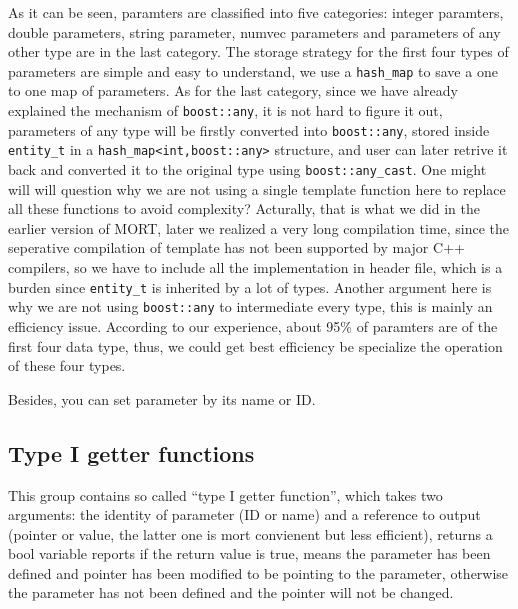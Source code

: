 \documentclass[letterpaper]{book}
\begin{document}
 As it can be seen, paramters are classified into five categories: integer paramters,
double parameters, string parameter, numvec parameters and parameters of any other type are
in the last category. The storage strategy for the first four types of parameters are simple
and easy to understand, we use a \lstinline$hash_map$ to save a one to one map of parameters. 
As for the last category, since we have already explained the mechanism of \lstinline$boost::any$, 
it is not hard to figure it out, parameters of any type will be firstly converted into 
\lstinline$boost::any$, stored inside \lstinline$entity_t$ in a \lstinline$hash_map<int,boost::any>$
structure, and user can later retrive it back and converted it to the original type using 
\lstinline$boost::any_cast$. One might will will question why we are not using a single template
function here to replace all these functions to avoid complexity? Acturally, that is what we did in the
earlier version of MORT, later we realized a very long compilation time, since the seperative compilation
of template has not been supported by major C++ compilers, so we have to include all the implementation
in header file, which is a burden since \lstinline$entity_t$ is inherited by a lot of types. 
Another argument here is why we are not using \lstinline$boost::any$ to intermediate every type, this is 
mainly an efficiency issue. According to our experience, about 95\% of paramters are of the first four data 
type, thus, we could get best efficiency be specialize the operation of these four types.
  
  Besides, you can set parameter by its name or ID.

\subsection{Type I getter functions}
  This group contains so called ``type I getter function'', which takes two arguments: the identity of 
parameter (ID or name) and a reference to output (pointer or value, the latter one is mort convienent
but less efficient), returns a bool variable reports if the 
return value is true, means the parameter has been defined and pointer has been modified to be pointing to 
the parameter, otherwise the parameter has not been defined and the pointer will not be changed. 
\end{document}
